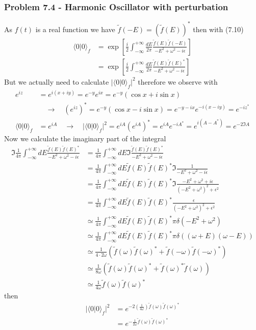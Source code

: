 \documentclass[10pt,a4paper]{article}
\theoremstyle{definition}
\begin{document}
\subsubsection{Problem 7.4 - Harmonic Oscillator with perturbation}
As $f(t)$ is a real function we have $\tilde f(-E)=(\tilde f(E))^*$ then with (7.10)
\begin{align}
\langle0|0\rangle_f
&=\exp\left[\frac{i}{2}\int_{-\infty}^{+\infty}\frac{dE}{2\pi}\frac{\tilde f(E)\tilde f(-E)}{-E^2+\omega^2-i\epsilon}\right]\\
&=\exp\left[\frac{i}{2}\int_{-\infty}^{+\infty}\frac{dE}{2\pi}\frac{\tilde f(E)\tilde f(E)^*}{-E^2+\omega^2-i\epsilon}\right]
\end{align}
But we actually need to calculate $|\langle0|0\rangle_f|^2$ therefore we observe with
\begin{align}
e^{iz}&=e^{i(x+iy)}=e^{-y}e^{ix}=e^{-y}(\cos x+i\sin x)\\
&\quad\rightarrow\quad (e^{iz})^*=e^{-y}(\cos x-i\sin x)=e^{-y-ix}e^{-i(x-iy)}=e^{-iz^*}\\
\langle0|0\rangle_f&=e^{iA}\quad\rightarrow\quad|\langle0|0\rangle_f|^2=e^{iA}(e^{iA})^*=e^{iA}e^{-iA^*}=e^{i(A-A^*)}=e^{-2\Im A}
\end{align}
Now we calculate the imaginary part of the integral
\begin{align}
\Im\frac{1}{4\pi}\int_{-\infty}^{+\infty}dE\frac{\tilde f(E)\tilde f(E)^*}{-E^2+\omega^2-i\epsilon}
&=\frac{1}{4\pi}\int_{-\infty}^{+\infty}dE\Im\frac{\tilde f(E)\tilde f(E)^*}{-E^2+\omega^2-i\epsilon}\\
&=\frac{1}{4\pi}\int_{-\infty}^{+\infty}dE\tilde f(E)\tilde f(E)^*\Im\frac{1}{-E^2+\omega^2-i\epsilon}\\
&=\frac{1}{4\pi}\int_{-\infty}^{+\infty}dE\tilde f(E)\tilde f(E)^*\Im\frac{-E^2+\omega^2+i\epsilon}{(-E^2+\omega^2)^2+\epsilon^2}\\
&=\frac{1}{4\pi}\int_{-\infty}^{+\infty}dE\tilde f(E)\tilde f(E)^*\frac{\epsilon}{(-E^2+\omega^2)^2+\epsilon^2}\\
&\simeq\frac{1}{4\pi}\int_{-\infty}^{+\infty}dE\tilde f(E)\tilde f(E)^*\pi\delta(-E^2+\omega^2)\\
&\simeq\frac{1}{4\pi}\int_{-\infty}^{+\infty}dE\tilde f(E)\tilde f(E)^*\pi\delta((\omega+E)(\omega-E))\\
&\simeq\frac{1}{4\cdot 2\omega}(\tilde f(\omega)\tilde f(\omega)^*+\tilde f(-\omega)\tilde f(-\omega)^*)\\
&\simeq\frac{1}{8\omega}(\tilde f(\omega)\tilde f(\omega)^*+\tilde f(\omega)^*\tilde f(\omega))\\
&\simeq\frac{1}{4\omega}\tilde f(\omega)\tilde f(\omega)^*
\end{align}
then
\begin{align}
|\langle0|0\rangle_f|^2
&=e^{-2\left(\frac{1}{4\omega}\right)\tilde f(\omega)\tilde f(\omega)^*}\\
&=e^{-\frac{1}{2\omega}\tilde f(\omega)\tilde f(\omega)^*}\\
\end{align}
\end{document}
